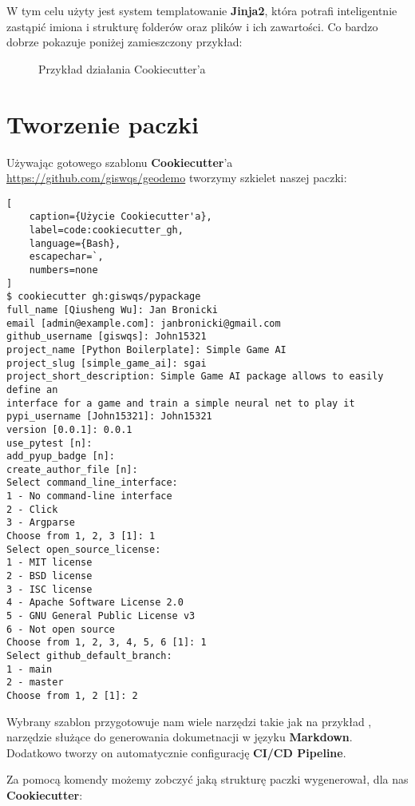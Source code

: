 W tym celu użyty jest system templatowanie \textbf{Jinja2}, która potrafi inteligentnie zastąpić imiona i strukturę folderów oraz plików i ich zawartości. Co bardzo dobrze pokazuje poniżej zamieszczony przykład:

\begin{figure}[h]
    \centering
    \caption{Przykład działania Cookiecutter'a \cite{CookiecutterExample}}
    \label{img:cookiecutter_example}
\end{figure}


\clearpage
\section{Tworzenie paczki}

Używając gotowego szablonu \textbf{Cookiecutter}'a
\url{https://github.com/giswqs/geodemo} tworzymy szkielet naszej paczki:

\begin{onepage}
    \begin{lstlisting}[
    caption={Użycie Cookiecutter'a},
    label=code:cookiecutter_gh,
    language={Bash},
    escapechar=`,
    numbers=none
]
$ cookiecutter gh:giswqs/pypackage
full_name [Qiusheng Wu]: Jan Bronicki
email [admin@example.com]: janbronicki@gmail.com
github_username [giswqs]: John15321
project_name [Python Boilerplate]: Simple Game AI
project_slug [simple_game_ai]: sgai
project_short_description: Simple Game AI package allows to easily define an
interface for a game and train a simple neural net to play it
pypi_username [John15321]: John15321
version [0.0.1]: 0.0.1
use_pytest [n]:
add_pyup_badge [n]:
create_author_file [n]:
Select command_line_interface:
1 - No command-line interface
2 - Click
3 - Argparse
Choose from 1, 2, 3 [1]: 1
Select open_source_license:
1 - MIT license
2 - BSD license
3 - ISC license
4 - Apache Software License 2.0
5 - GNU General Public License v3
6 - Not open source
Choose from 1, 2, 3, 4, 5, 6 [1]: 1
Select github_default_branch:
1 - main
2 - master
Choose from 1, 2 [1]: 2
\end{lstlisting}
\end{onepage}

Wybrany szablon przygotowuje nam wiele narzędzi takie jak na przykład , narzędzie służące do generowania dokumetnacji w języku \textbf{Markdown}.
Dodatkowo tworzy on automatycznie configurację \textbf{CI/CD Pipeline}.

\clearpage

Za pomocą komendy  możemy zobczyć jaką strukturę paczki wygenerował, dla nas \textbf{Cookiecutter}:

